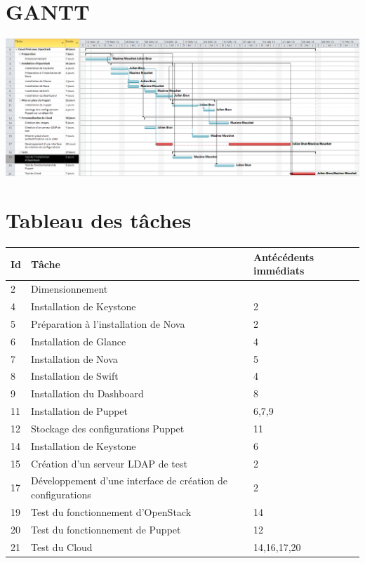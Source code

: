 \section{GANTT}
\includegraphics[width=25cm,angle=90]{images/gantt.png}

\section{Tableau des tâches}
\begin{tabular}{|l|l|l|}
\hline
Id & Tâche & Antécédents immédiats \tabularnewline
\hline
2 & Dimensionnement & \tabularnewline
\hline
4 & Installation de Keystone & 2 \tabularnewline
\hline
5 & Préparation à l'installation de Nova & 2 \tabularnewline
\hline
6 & Installation de Glance & 4 \tabularnewline
\hline
7 & Installation de Nova & 5 \tabularnewline
\hline
8 & Installation de Swift & 4 \tabularnewline
\hline
9 & Installation du Dashboard & 8 \tabularnewline
\hline
11 & Installation de Puppet & 6,7,9 \tabularnewline
\hline
12 & Stockage des configurations Puppet & 11 \tabularnewline
\hline
14 & Installation de Keystone & 6 \tabularnewline
\hline
15 & Création d'un serveur LDAP de test & 2 \tabularnewline
\hline
17 & Développement d'une interface de création de configurations & 2 \tabularnewline
\hline
19 & Test du fonctionnement d'OpenStack & 14 \tabularnewline
\hline
20 & Test du fonctionnement de Puppet & 12 \tabularnewline
\hline
21 & Test du Cloud & 14,16,17,20 \tabularnewline
\hline
\end{tabular}

